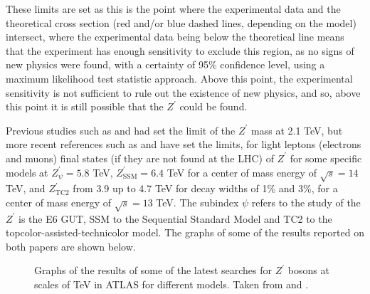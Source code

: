 These limits are set as this is the point where the experimental data and the theoretical cross section (red and/or blue dashed lines, depending on the model) intersect, where the experimental data being below the theoretical line means that the experiment has enough sensitivity to exclude this region, as no signs of new physics were found, with a certainty of 95\% confidence level, using a maximum likelihood test statistic approach. Above this point, the experimental sensitivity is not sufficient to rule out the existence of new physics, and so, above this point it is still possible that the $Z^{\prime}$ could be found.

Previous studies such as \cite{Aaboud} and \cite{Sirunyan} had set the limit of the $Z^{\prime}$ mass at 2.1 TeV, but more recent references such as \cite{results1} and \cite{results2} have set the limits, for light leptons (electrons and muons) final states (if they are not found at the LHC) of $Z^{\prime}$ for some specific models at $Z^{\prime}_{\psi}=5.8$ TeV, $Z^{\prime}_{\textrm{SSM}}=6.4$ TeV for a center of mass energy of $\sqrt{s}=14$ TeV, and $Z^{\prime}_{\textrm{TC2}}$ from 3.9 up to 4.7 TeV for decay widths of 1\% and 3\%, for a center of mass energy of $\sqrt{s}=13$ TeV. The subindex $\psi$ refers to the study of the $Z^{\prime}$ is the E6 GUT, SSM to the Sequential Standard Model and TC2 to the topcolor-assisted-technicolor model. The graphs of some of the results reported on both papers are shown below.

\begin{figure}[!htb]
     \begin{center}
    \end{center}
    \vspace{-1\baselineskip}
    \caption{Graphs of the results of some of the latest searches for $Z^{\prime}$ bosons at scales of TeV in ATLAS for different models. Taken from \cite{results1} and \cite{results2}.}
   \label{limits}
\end{figure}


